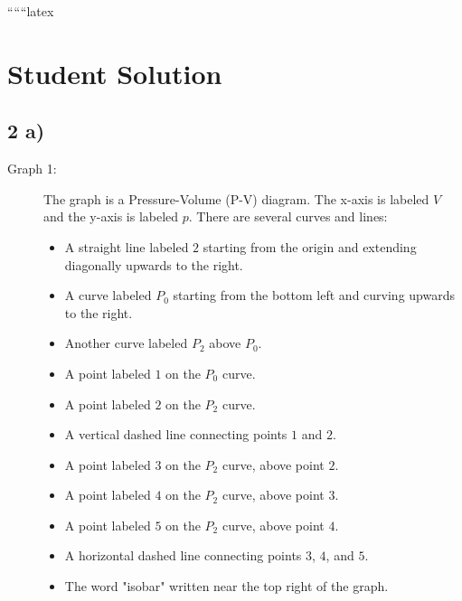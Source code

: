 
``````latex


\section*{Student Solution}

\subsection*{2 a)}

\begin{description}
    \item[Graph 1:] The graph is a Pressure-Volume (P-V) diagram. The x-axis is labeled $V$ and the y-axis is labeled $p$. There are several curves and lines:
    \begin{itemize}
        \item A straight line labeled $2$ starting from the origin and extending diagonally upwards to the right.
        \item A curve labeled $P_0$ starting from the bottom left and curving upwards to the right.
        \item Another curve labeled $P_2$ above $P_0$.
        \item A point labeled $1$ on the $P_0$ curve.
        \item A point labeled $2$ on the $P_2$ curve.
        \item A vertical dashed line connecting points $1$ and $2$.
        \item A point labeled $3$ on the $P_2$ curve, above point $2$.
        \item A point labeled $4$ on the $P_2$ curve, above point $3$.
        \item A point labeled $5$ on the $P_2$ curve, above point $4$.
        \item A horizontal dashed line connecting points $3$, $4$, and $5$.
        \item The word "isobar" written near the top right of the graph.
    \end{itemize}
    

\end{description}
